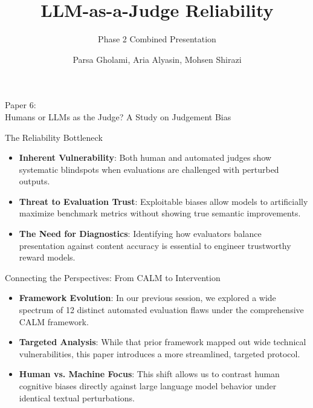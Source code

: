 \documentclass[10pt]{beamer}
\begin{document}
\title{LLM-as-a-Judge Reliability}
\subtitle{Phase 2 Combined Presentation}
\date{}
\author{Parsa Gholami, Aria Alyasin, Mohsen Shirazi}


\begin{frame}[standout]
  \hypertarget{paper6}{}
  \Large Paper 6:\\Humans or LLMs as the Judge? A Study on Judgement Bias
\end{frame}

 \begin{frame}{The Reliability Bottleneck}
  \begin{itemize}
    \item \textbf{Inherent Vulnerability}: Both human and automated judges show systematic blindspots when evaluations are challenged with perturbed outputs.
    \item \textbf{Threat to Evaluation Trust}: Exploitable biases allow models to artificially maximize benchmark metrics without showing true semantic improvements.
    \item \textbf{The Need for Diagnostics}: Identifying how evaluators balance presentation against content accuracy is essential to engineer trustworthy reward models.
  \end{itemize}
\end{frame}

\begin{frame}{Connecting the Perspectives: From CALM to Intervention}
  \begin{itemize}
    \item \textbf{Framework Evolution}: In our previous session, we explored a wide spectrum of 12 distinct automated evaluation flaws under the comprehensive CALM framework.
    \item \textbf{Targeted Analysis}: While that prior framework mapped out wide technical vulnerabilities, this paper introduces a more streamlined, targeted protocol.
    \item \textbf{Human vs. Machine Focus}: This shift allows us to contrast human cognitive biases directly against large language model behavior under identical textual perturbations.
  \end{itemize}
\end{frame}
\end{document}
